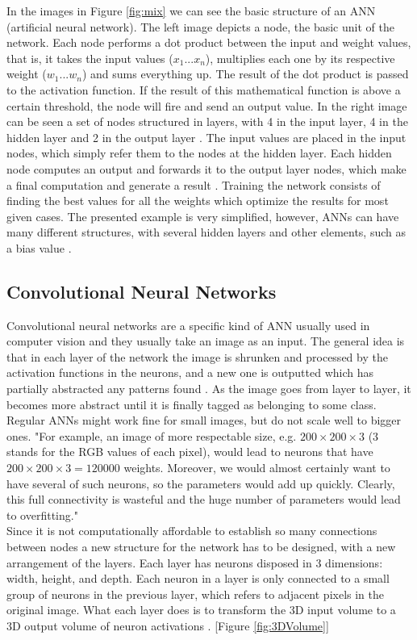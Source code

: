  In the images in Figure \ref{fig:mix} we can see the basic structure of an ANN (artificial neural network). The left image depicts a node, the basic unit of the network. Each node performs a dot product between the input and weight values, that is, it takes the input values ($x_1... x_n$), multiplies each one by its respective weight ($w_1... w_n$) and sums everything up. The result of the dot product is passed to the activation function. If the result of this mathematical function is above a certain threshold, the node will fire and send an output value. In the right image can be seen a set of nodes structured in layers, with 4 in the input layer, 4 in the hidden layer and 2 in the output layer \cite{cs231n}. The input values are placed in the input nodes, which simply refer them to the nodes at the hidden layer. Each hidden node computes an output and forwards it to the output layer nodes, which make a final computation and generate a result \cite{airola2017}. Training the network consists of finding the best values for all the weights which optimize the results for most given cases. The presented example is very simplified, however, ANNs can have many different structures, with several hidden layers and other elements, such as a bias value \cite{cs231n}. \\


\subsection{Convolutional Neural Networks}
Convolutional neural networks are a specific kind of ANN usually used in computer vision and they usually take an image as an input. The general idea is that in each layer of the network the image is shrunken and processed by the activation functions in the neurons, and a new one is outputted which has partially abstracted any patterns found \cite{lee2009convolutional}. As the image goes from layer to layer, it becomes more abstract until it is finally tagged as belonging to some class. \\
Regular ANNs might work fine for small images, but do not scale well to bigger ones. "For example, an image of more respectable size, e.g. $200\times200\times3$ (3 stands for the RGB values of each pixel), would lead to neurons that have $200\times200\times3 = 120000$ weights. Moreover, we would almost certainly want to have several of such neurons, so the parameters would add up quickly. Clearly, this full connectivity is wasteful and the huge number of parameters would lead to overfitting." \cite{cs231n} \\
Since it is not computationally affordable to establish so many connections between nodes a new structure for the network has to be designed, with a new arrangement of the layers. Each layer has neurons disposed in 3 dimensions: width, height, and depth. Each neuron in a layer is only connected to a small group of neurons in the previous layer, which refers to adjacent pixels in the original image. What each layer does is to transform the 3D input volume to a 3D output volume of neuron activations \cite{cs231n}. [Figure \ref{fig:3DVolume}]

